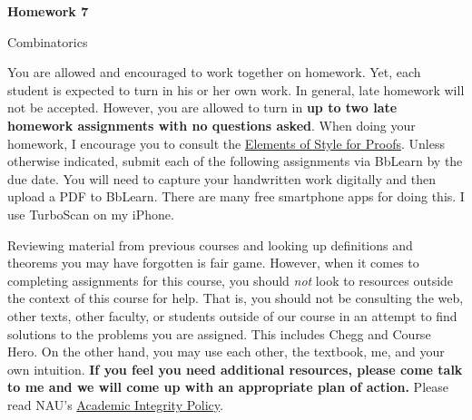 \documentclass[11pt]{article}%
\theoremstyle{definition}
\newcommand{\blankline}{\pagebreak[2]\vspace{.5\baselineskip}}
\begin{document}
\begin{center}
{\Large\bf Homework 7}

\smallskip

Combinatorics
\end{center}

\thispagestyle{fancy}

You are allowed and encouraged to work together on homework. Yet, each student is expected to turn in his or her own work. In general, late homework will not be accepted. However, you are allowed to turn in \textbf{up to two late homework assignments with no questions asked}. When doing your homework, I encourage you to consult the \href{http://danaernst.com/teaching/ElementsOfStyle.pdf}{Elements of Style for Proofs}. Unless otherwise indicated, submit each of the following assignments via BbLearn by the due date. You will need to capture your handwritten work digitally and then upload a PDF to BbLearn. There are many free smartphone apps for doing this. I use TurboScan on my iPhone.

\blankline

Reviewing material from previous courses and looking up definitions and theorems you may have forgotten is fair game. However, when it comes to completing assignments for this course, you should \emph{not} look to resources outside the context of this course for help.  That is, you should not be consulting the web, other texts, other faculty, or students outside of our course in an attempt to find solutions to the problems you are assigned.  This includes Chegg and Course Hero. On the other hand, you may use each other, the textbook, me, and your own intuition. \textbf{If you feel you need additional resources, please come talk to me and we will come up with an appropriate plan of action.} Please read NAU's \href{https://www5.nau.edu/policies/Client/Details/828?whoIsLooking=Students&pertainsTo=All&sortDirection=Ascending&page=1}{Academic Integrity Policy}.

\blankline
\end{document}
